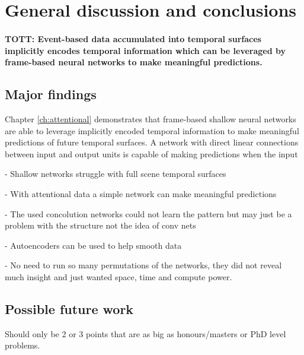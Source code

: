 \chapter{General discussion and conclusions}

\subsubsection{\textbf{TOTT: Event-based data accumulated into temporal surfaces implicitly encodes temporal information which can be leveraged by frame-based neural networks to make meaningful predictions.}}

\section{Major findings}
Chapter \ref{ch:attentional} demonstrates that frame-based shallow neural networks are able to leverage implicitly encoded temporal information to make meaningful predictions of future temporal surfaces. 
A network with direct linear connections between input and output units is capable of making predictions when the input 

- Shallow networks struggle with full scene temporal surfaces

- With attentional data a simple network can make meaningful predictions

- The used concolution networks could not learn the pattern but may just be a problem with the structure not the idea of conv nets

- Autoencoders can be used to help smooth data

- No need to run so many permutations of the networks, they did not reveal much insight and just wanted space, time and compute power. 





\section{Possible future work}
Should only be 2 or 3 points that are as big as honours/masters or PhD level problems. 

